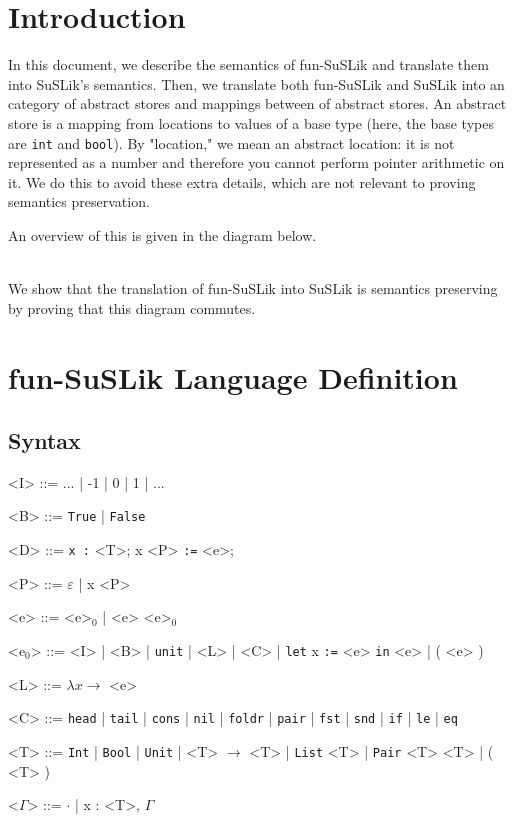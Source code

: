 \documentclass[10pt]{article}
\newcommand{\ttt}[1]{\texttt{#1}}
\newcommand{\ra}{\ensuremath{\rightarrow}}
\newcommand{\head}{\ttt{head}}
\newcommand{\tail}{\ttt{tail}}
\newcommand{\cons}{\ttt{cons}}
\newcommand{\nil}{\ttt{nil}}
\newcommand{\foldr}{\ttt{foldr}}
\newcommand{\pair}{\ttt{pair}}
\newcommand{\fst}{\ttt{fst}}
\newcommand{\snd}{\ttt{snd}}
\newcommand{\ite}{\ttt{if}}
\newcommand{\letbnd}{\ttt{let}}
\newcommand{\inexpr}{\ttt{in}}
\newcommand{\lesseq}{\ttt{le}}
\newcommand{\eq}{\ttt{eq}}
\newcommand{\sem} [1] {\llbracket#1\rrbracket}
\newcommand{\Gsem} [1] {\mathcal{G}\sem{#1}}
\newcommand{\Ssem} [1] {\mathcal{S}\sem{#1}}
\begin{document}
\section{Introduction}

In this document, we describe the semantics of fun-SuSLik and translate them
into SuSLik's semantics. Then, we translate both fun-SuSLik and SuSLik into an
category of abstract stores and mappings between of abstract stores. An abstract store is a
mapping from locations to values of a base type (here, the base types are \verb|int| and \verb|bool|).
By "location," we mean an abstract location: it is not represented as a number and therefore
you cannot perform pointer arithmetic on it. We do this to avoid these extra details, which
are not relevant to proving semantics preservation.

An overview of this is given in the diagram below.
\\


~\\
\noindent
We show that the translation of fun-SuSLik into SuSLik is semantics preserving by proving that this diagram commutes.


\section{fun-SuSLik Language Definition}
\subsection{Syntax}

\begin{grammar}
  <I> ::= ... | -1 | 0 | 1 | ...

  <B> ::= \ttt{True} | \ttt{False}

  <D> ::= \ttt{x :} <T>; x <P> \ttt{:=} <e>;

  <P> ::= $\varepsilon$ | x <P>

  <e> ::= <e>$_0$ | <e> <e>$_0$

  <e$_0$> ::= <I> | <B> | \ttt{unit} | <L> | <C> | \letbnd\; x \ttt{:=} <e> \inexpr\; <e> | ( <e> )

  <L> ::= $\lambda x \ra$ <e>

  <C> ::= \head\; | \tail\; | \cons\; | \nil\; | \foldr\; | \pair\; | \fst\; | \snd\; | \ite\; | \lesseq\; | \eq

  <T> ::= \ttt{Int} | \ttt{Bool} | \ttt{Unit} | <T> $\ra$ <T> | \ttt{List} <T> | \ttt{Pair} <T> <T> | ( <T> )

  <$\Gamma$> ::= $\cdot$ | x : <T>, $\Gamma$
\end{grammar}
\end{document}
